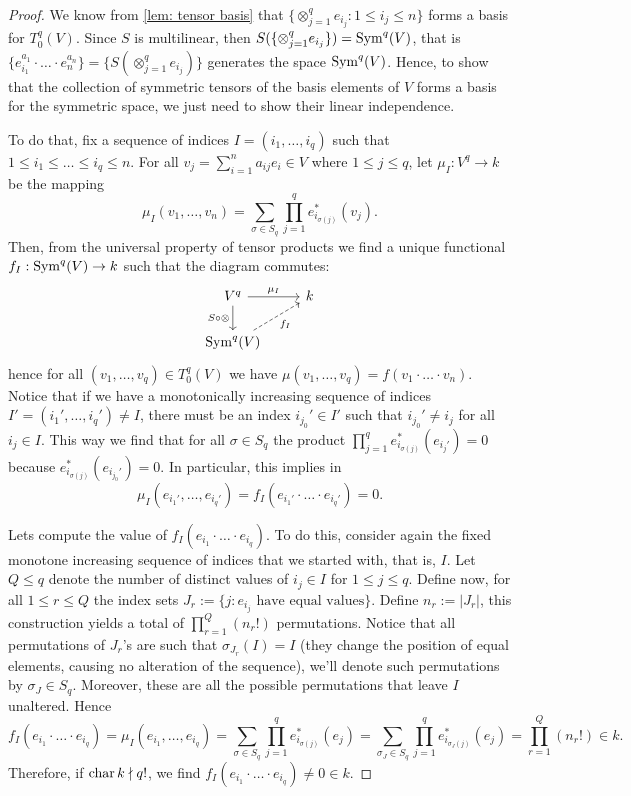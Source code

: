 \begin{proof}
  We know from \cref{lem: tensor basis} that \(\{\otimes_{j=1}^q e_{i_j}: 1 \leq
  i_j \leq n\}\) forms a basis for \(T_0^q(V)\). Since \(S\) is multilinear,
  then \(S(\{\otimes_{j=1}^q e_{i_j}\}) = \operatorname{Sym}^q(V)\), that is \(\{e_{i_1}^{a_1}
  \cdot \ldots \cdot e_n^{a_n}\} = \{S(\otimes_{j=1}^q e_{i_j})\}\) generates
  the space \(\operatorname{Sym}^q(V)\). Hence, to show that the collection of symmetric
  tensors of the basis elements of \(V\) forms a basis for the symmetric space,
  we just need to show their linear independence.

  To do that, fix a sequence of indices \(I = (i_1, \dots, i_q)\) such that  \(1
  \leq i_1 \leq \dots \leq i_q \leq n\). For all \(v_j = \sum_{i=1}^n a_{ij} e_i
  \in V\) where \(1 \leq j \leq q\), let \(\mu_I: V^q \to k\) be the mapping
  \[
    \mu_I(v_1, \dots, v_n) = \sum_{\sigma \in S_q} \prod_{j=1}^q
    e_{i_{\sigma(j)}}^*(v_j).
  \]
  Then, from the universal property of tensor products we find a unique
  functional \(f_I: \operatorname{Sym}^q(V) \to k\) such that the diagram commutes:
  \[
    \begin{tikzcd}
      V^q \ar[r, "\mu_I"] \ar[d, swap, "S \circ \otimes"] &k \\
      \Sym^q(V) \ar[ru, swap, dashed, "f_I"]
    \end{tikzcd}
  \]
  hence for all \((v_1, \dots, v_q) \in T_0^q(V)\) we have \(\mu(v_1, \dots,
  v_q) = f(v_1 \cdot \ldots \cdot v_n)\). Notice that if we have a monotonically
  increasing sequence of indices \(I' = (i_1', \dots, i_q') \neq I\), there must
  be an index \(i_{j_0}' \in I'\) such that \(i_{j_0}' \neq i_j\) for all \(i_j
  \in I\). This way we find that for all \(\sigma \in S_q\) the product
  \(\prod_{j=1}^q e_{i_{\sigma(j)}}^*(e_{i_j'}) = 0\) because
  \(e_{i_{\sigma(j)}}^*(e_{i_{j_0}'}) = 0\). In particular, this implies in
  \[
    \mu_I(e_{i_1'}, \dots, e_{i_q'}) = f_I(e_{i_1'} \cdot \ldots \cdot e_{i_q'})
    = 0.
  \]

  Lets compute the value of \(f_I(e_{i_1} \cdot \ldots \cdot e_{i_q})\). To do
  this, consider again the fixed monotone increasing sequence of indices that we
  started with, that is, \(I\). Let \(Q \leq q\) denote the number of distinct
  values of \(i_j \in I\) for \(1 \leq j \leq q\). Define now, for all \(1 \leq
  r \leq Q\) the index sets \(J_r := \{j : e_{i_j} \text{ have equal
  values}\}\). Define \(n_r := |J_r|\), this construction yields a total of
  \(\prod_{r=1}^Q (n_r!)\) permutations. Notice that all permutations of
  \(J_r\)'s are such that \(\sigma_{J_r}(I) = I\) (they change the position of
  equal elements, causing no alteration of the sequence), we'll denote such
  permutations by \(\sigma_J \in S_q\). Moreover, these are
  all the possible permutations that leave \(I\) unaltered. Hence
  \[
    f_I(e_{i_1} \cdot \ldots \cdot e_{i_q}) = \mu_I(e_{i_1}, \dots, e_{i_q})
    = \sum_{\sigma \in S_q} \prod_{j=1}^q e_{i_{\sigma(j)}}^*(e_j)
    = \sum_{\sigma_J \in S_q} \prod_{j=1}^q e_{i_{\sigma_J(j)}}^*(e_j)
    = \prod_{r=1}^Q (n_r!) \in k.
  \]
  Therefore, if \(\operatorname{char} k \nmid q!\), we find \(f_I(e_{i_1} \cdot \ldots \cdot
  e_{i_q}) \neq 0 \in k\).


\end{proof}
